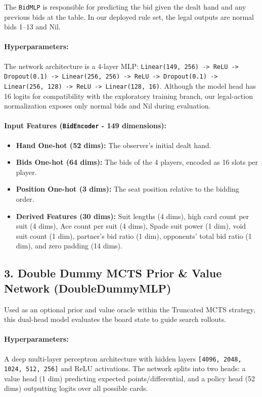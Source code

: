 \documentclass{article}
\begin{document}
The \texttt{BidMLP} is responsible for predicting the bid given the dealt hand and any previous bids at the table. In our deployed rule set, the legal outputs are normal bids 1--13 and Nil.

\paragraph{Hyperparameters:}
The network architecture is a 4-layer MLP: \texttt{Linear(149, 256) -> ReLU -> Dropout(0.1) -> Linear(256, 256) -> ReLU -> Dropout(0.1) -> Linear(256, 128) -> ReLU -> Linear(128, 16)}. Although the model head has 16 logits for compatibility with the exploratory training branch, our legal-action normalization exposes only normal bids and Nil during evaluation.

\paragraph{Input Features (\texttt{BidEncoder} - 149 dimensions):}
\begin{itemize}
    \item \textbf{Hand One-hot (52 dims):} The observer's initial dealt hand.
    \item \textbf{Bids One-hot (64 dims):} The bids of the 4 players, encoded as 16 slots per player.
    \item \textbf{Position One-hot (3 dims):} The seat position relative to the bidding order.
    \item \textbf{Derived Features (30 dims):} Suit lengths (4 dims), high card count per suit (4 dims), Ace count per suit (4 dims), Spade suit power (1 dim), void suit count (1 dim), partner's bid ratio (1 dim), opponents' total bid ratio (1 dim), and zero padding (14 dims).
\end{itemize}

\subsection{3. Double Dummy MCTS Prior \& Value Network (DoubleDummyMLP)}

Used as an optional prior and value oracle within the Truncated MCTS strategy, this dual-head model evaluates the board state to guide search rollouts.

\paragraph{Hyperparameters:}
A deep multi-layer perceptron architecture with hidden layers \texttt{[4096, 2048, 1024, 512, 256]} and ReLU activations. The network splits into two heads: a value head (1 dim) predicting expected points/differential, and a policy head (52 dims) outputting logits over all possible cards.
\end{document}
